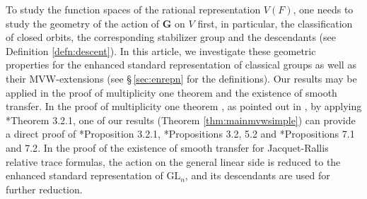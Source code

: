 \documentclass[12pt]{amsart}
\theoremstyle{definition}
\theoremstyle{remark}\newtheorem{rmk}[lm]{Remark}
\newcommand{\GL}{{\mathrm{GL}}}
\newcommand{\C}{\mathbb{F}}
\renewcommand{\H}{\mathbb{H}}
\newcommand{\G}{\mathbf{G}}
\renewcommand{\H}{\mathbf{H}}
\begin{document}
To study the function spaces of the rational representation $V(F)$, one needs to study the geometry of the action of $\G$ on $V$ first, in particular, the classification of closed orbits, the corresponding stabilizer group and the descendants (see Definition \ref{defn:descent}). In this article, we investigate these geometric properties for the enhanced standard representation of classical groups as well as their MVW-extensions (see \S\,\ref{sec:enrepn} for the definitions). Our results may be applied in the proof of multiplicity one theorem and the existence of smooth transfer. In the proof of multiplicity one theorem \cite{AGb,AGRS,SZ}, as pointed out in \cite{AGb}, by applying \cite{AG}*{Theorem 3.2.1}, one of our results (Theorem \ref{thm:mainmvwsimple}) can provide a direct proof of \cite{AGb}*{Proposition 3.2.1}, \cite{AGRS}*{Propositions 3.2, 5.2} and \cite{SZ}*{Propositions 7.1 and 7.2}. In the proof of the existence of smooth transfer \cite{Zha14, Xue19, CZ21} for Jacquet-Rallis relative trace formulas, the action on the general linear side is reduced to the enhanced standard representation of $\GL_n$, and its descendants are used for further reduction.
    

    
\end{document}
